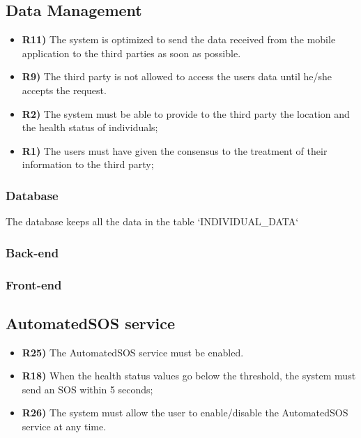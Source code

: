 \subsection{Data Management}
\begin{itemize}	
	\item {\color{Green}\textbf{R11)}} The system is optimized to send the data received from the mobile application to the third parties as soon as possible.
	\item {\color{Green}\textbf{R9)}} The third party is not allowed to access the users data until he/she accepts the request.
	\item {\color{Green}\textbf{R2)}} The system must be able to provide to the third party the location and the health status of individuals;
	\item {\color{Green}\textbf{R1)}} The users must have given the consensus to the treatment of their information to the third party;
\end{itemize}

\subsubsection*{Database}
The database keeps all the data in the table `INDIVIDUAL\_DATA`


\subsubsection*{Back-end}


\subsubsection*{Front-end}


\subsection{AutomatedSOS service}
\begin{itemize}	
	\item {\color{Green}\textbf{R25)}} The AutomatedSOS service must be enabled.
	\item {\color{Green}\textbf{R18)}} When the health status values go below the threshold, the system must send an SOS within 5 seconds;
	\item {\color{Green}\textbf{R26)}}	 The system must allow the user to enable/disable the AutomatedSOS service at any time.
\end{itemize}

